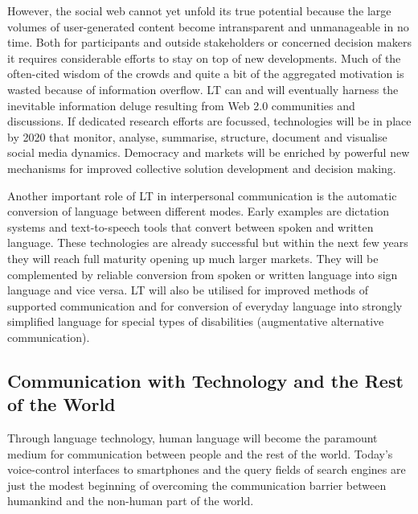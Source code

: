 \documentclass[10pt, plain]{../../metanetpaper}
\begin{document}
\begin{multicols}{2}
However, the social web cannot yet unfold its true potential because the large volumes of user-generated content become intransparent and unmanageable in no time. Both for participants and outside stakeholders or concerned decision makers it requires considerable efforts to stay on top of new developments. Much of the often-cited wisdom of the crowds and quite a bit of the aggregated motivation is wasted because of information overflow. LT can and will eventually harness the inevitable information deluge resulting from Web 2.0 communities and discussions. If dedicated research efforts are focussed, technologies will be in place by 2020 that monitor, analyse, summarise, structure, document and visualise social media dynamics. Democracy and markets will be enriched by powerful new mechanisms for improved collective solution development and decision making.

Another important role of LT in interpersonal communication is the automatic conversion of language between different modes. Early examples are dictation systems and text-to-speech tools that convert between spoken and written language. These technologies are already successful but within the next few years they will reach full maturity opening up much larger markets. They will be complemented by reliable conversion from spoken or written language into sign language and vice versa. LT will also be utilised for improved methods of supported communication and for conversion of everyday language into strongly simplified language for special types of disabilities (augmentative alternative communication).

\subsection{Communication with Technology and the Rest of the World}
\label{sec:comm-with-techn}

Through language technology, human language will become the paramount medium for communication between people and the rest of the world. Today’s voice-control interfaces to smartphones and the query fields of search engines are just the modest beginning of overcoming the communication barrier between humankind and the non-human part of the world.
 

\end{multicols}
\end{document}
